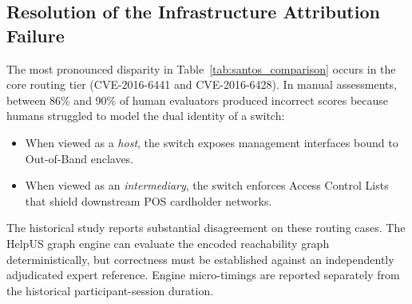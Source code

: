 \subsection{Resolution of the Infrastructure Attribution Failure}
The most pronounced disparity in Table~\ref{tab:santos_comparison} occurs in the core routing tier (CVE-2016-6441 and CVE-2016-6428). In manual assessments, between 86\% and 90\% of human evaluators produced incorrect scores because humans struggled to model the dual identity of a switch:
\begin{itemize}
    \item When viewed as a \textit{host}, the switch exposes management interfaces bound to Out-of-Band enclaves.
    \item When viewed as an \textit{intermediary}, the switch enforces Access Control Lists that shield downstream POS cardholder networks.
\end{itemize}
The historical study reports substantial disagreement on these routing cases. The HelpUS graph engine can evaluate the encoded reachability graph deterministically, but correctness must be established against an independently adjudicated expert reference. Engine micro-timings are reported separately from the historical participant-session duration.



